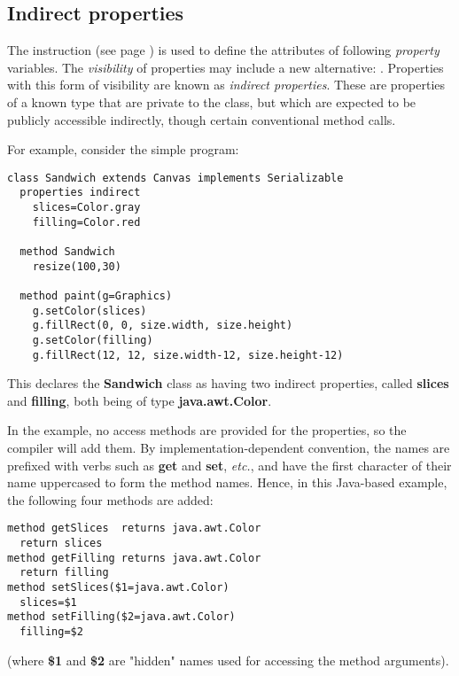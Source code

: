 \subsection{Indirect properties}\label{refindprop}
 
The   instruction (see page \pageref{refprop})  is used to
define the attributes of following \emph{property} variables.
The \emph{visibility} of properties may include a new alternative:
.
Properties with this form of visibility are known as \emph{indirect
properties}.  These are properties of a known type that are private
to the class, but which are expected to be publicly accessible
indirectly, though certain conventional method calls.
 
For example, consider the simple program:
\begin{lstlisting}[label=sandwich,caption=Sandwich.nrx]
class Sandwich extends Canvas implements Serializable
  properties indirect
    slices=Color.gray
    filling=Color.red

  method Sandwich
    resize(100,30)

  method paint(g=Graphics)
    g.setColor(slices)
    g.fillRect(0, 0, size.width, size.height)
    g.setColor(filling)
    g.fillRect(12, 12, size.width-12, size.height-12)
\end{lstlisting}
This declares the \textbf{Sandwich} class as having two indirect
properties, called \textbf{slices} and \textbf{filling}, both being
of type \textbf{java.awt.Color}.
 
In the example, no access methods are provided for the properties, so
the compiler will add them.  By implementation-dependent convention, the
names are prefixed with verbs such as \textbf{get} and \textbf{set},
\emph{etc.}, and have the first character of their name uppercased to form the
method names.
Hence, in this Java-based example, the following four methods are added:
\begin{lstlisting}[label=slices,caption=Slices]
method getSlices  returns java.awt.Color
  return slices
method getFilling returns java.awt.Color
  return filling
method setSlices($1=java.awt.Color)
  slices=$1
method setFilling($2=java.awt.Color)
  filling=$2
\end{lstlisting}
(where \textbf{\$1} and \textbf{\$2} are "hidden" names used for
accessing the method arguments).
 

